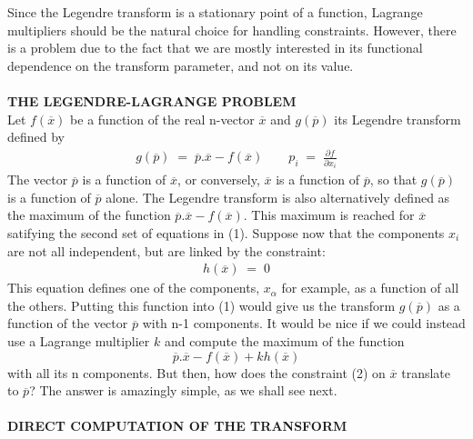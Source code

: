 \documentclass[12pt]{article}
\begin{document}
Since the Legendre transform is a stationary point of a function, Lagrange multipliers should be the natural choice for handling constraints. However, there is a problem due to the fact that we are mostly interested in its functional dependence on the transform parameter, and not on its value.\\\\
\textbf{THE LEGENDRE-LAGRANGE PROBLEM}\\

Let $f(\overline{x})$ be a function of the real n-vector $\overline{x}$ and $g(\overline{p})$ its Legendre transform defined by
\begin{align}
g(\overline{p}) \;=\;\overline{p}.\overline{x}-f(\overline{x})\quad\quad p_i\;=\;\frac{\partial f}{\partial x_i}
\end{align}
The vector $\overline{p}$ is a function of $\overline{x}$, or conversely, $\overline{x}$ is a function of $\overline{p}$, so that $g(\overline{p})$ is a function of $\overline{p}$ alone.
The Legendre transform is also alternatively defined as the maximum of the function $\overline{p}.\overline{x}-f(\overline{x})$. This maximum is reached for $\overline{x}$ satifying the second set of equations in (1).
Suppose now that the components $x_i$ are not all independent, but are linked by the constraint:
\begin{align}
h(\overline{x})\;=\;0
\end{align}
This equation defines one of the components, $x_\alpha$ for example, as a function of all the others. Putting this function into (1) would give us the transform $g(\overline{p})$ as a function of the vector $\overline{p}$ with n-1 components. It would be nice if we could instead use a Lagrange multiplier $k$ and compute the maximum of the function $$\overline{p}.\overline{x}-f(\overline{x})+kh(\overline{x})$$ with all its n components. But then, how does the constraint (2) on $\overline{x}$ translate to $\overline{p}$? The answer is amazingly simple, as we shall see next.\\\\
\textbf{DIRECT COMPUTATION OF THE TRANSFORM}\\
\end{document}
